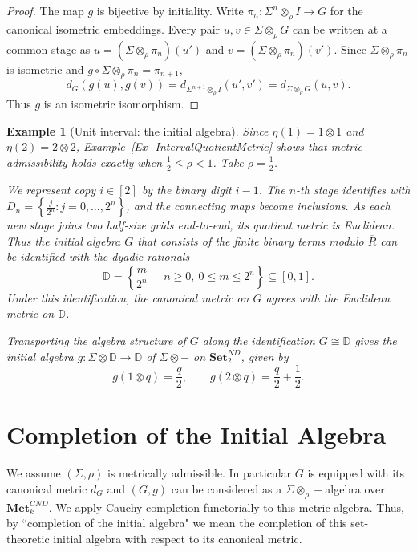 \documentclass{sn-jnl}%
\theoremstyle{thmstyleone}%
\theoremstyle{thmstyletwo}%
\newtheorem{example}{Example}%
\theoremstyle{thmstylethree}%
\newcommand{\mcnd}{\mathbf{Met}_{k}^{CND}}
\newcommand{\setndk}[1]{\mathbf{Set}_{#1}^{ND}}
\newcommand{\M}{\Sigma}
\newcommand{\F}{\M\otimes}
\newcommand{\Fw}{\M\otimes_{\w}}
\newcommand{\Fwi}[1]{\M^{#1}\otimes_{\w}}
\newcommand{\w}{\rho}
\begin{document}
\begin{proof}
The map $g$ is bijective by initiality. Write $\pi_n:\Fwi{n}I\to G$ for the canonical isometric embeddings. Every pair $u,v\in\Fw G$ can be written at a common stage as $u=(\Fw\pi_n)(u')$ and $v=(\Fw\pi_n)(v')$. Since $\Fw\pi_n$ is isometric and $g\circ\Fw\pi_n=\pi_{n+1}$,
\begin{equation} 
\nonumber
    d_G(g(u),g(v)) = d_{\Fwi{n+1}I}(u',v') = d_{\Fw G}(u,v).
\end{equation}
Thus $g$ is an isometric isomorphism.
\end{proof}

\begin{example}[Unit interval: the initial algebra]
\label{Ex_IntervalInitialAlgebra}
    Since $\eta(1)=1\otimes1$ and $\eta(2)=2\otimes2$, Example~\ref{Ex_IntervalQuotientMetric} shows that metric admissibility holds exactly when $\frac12\leq\rho<1$. Take $\rho=\frac12$. 
    
    We represent copy $i\in[2]$ by the binary digit $i-1$. The $n$-th stage identifies with $  D_n=\left\{\frac{j}{2^n}:j=0,\ldots,2^n\right\}$, and the connecting maps become inclusions. As each new stage joins two half-size grids end-to-end, its quotient metric is Euclidean. Thus the initial algebra $G$ that consists of the finite binary terms modulo $\overline R$ can be identified with the dyadic rationals
        \begin{equation} \nonumber
        \mathbb D = \left\{ \frac{m}{2^n} \;\middle|\; n\geq0,\ 0\leq m\leq2^n \right\} \subseteq [0,1].
    \end{equation}
    Under this identification, the canonical metric on $G$ agrees with the Euclidean metric on $\mathbb D$. 

    Transporting the algebra structure of $G$ along the identification $G\cong\mathbb D$ gives the initial algebra $g:\F\mathbb D\longrightarrow\mathbb D$ of $\F-$ on $\setndk{2}$, given by
    \begin{equation} \nonumber
       g(1\otimes q)=\frac q2, \qquad g(2\otimes q)=\frac q2+\frac12.
    \end{equation}
\end{example}

\section{Completion of the Initial Algebra}
\label{Sec:Completion}

We assume $(\Sigma,\w)$ is metrically admissible. In particular $G$ is equipped with its canonical metric $d_G$ and $(G, g)$ can  be considered as a $\Fw-$algebra over $\mcnd$. We apply Cauchy completion functorially to this metric algebra. Thus, by ``completion of the initial algebra" we mean the completion of this set-theoretic initial algebra with respect to its canonical metric. 
\end{document}
